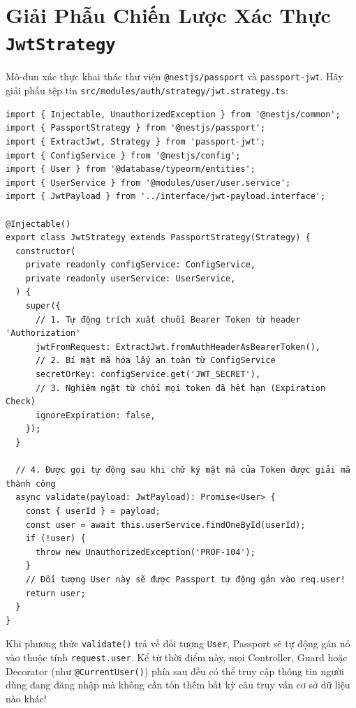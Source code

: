 \documentclass[12pt,a4paper,oneside]{book}
\begin{document}
\section{Giải Phẫu Chiến Lược Xác Thực \texttt{JwtStrategy}}
Mô-đun xác thực khai thác thư viện \texttt{@nestjs/passport} và \texttt{passport-jwt}. Hãy giải phẫu tệp tin \texttt{src/modules/auth/strategy/jwt.strategy.ts}:

\begin{codebox}
\begin{Verbatim}[fontsize=\small]
import { Injectable, UnauthorizedException } from '@nestjs/common';
import { PassportStrategy } from '@nestjs/passport';
import { ExtractJwt, Strategy } from 'passport-jwt';
import { ConfigService } from '@nestjs/config';
import { User } from '@database/typeorm/entities';
import { UserService } from '@modules/user/user.service';
import { JwtPayload } from '../interface/jwt-payload.interface';

@Injectable()
export class JwtStrategy extends PassportStrategy(Strategy) {
  constructor(
    private readonly configService: ConfigService,
    private readonly userService: UserService,
  ) {
    super({
      // 1. Tự động trích xuất chuỗi Bearer Token từ header 'Authorization'
      jwtFromRequest: ExtractJwt.fromAuthHeaderAsBearerToken(),
      // 2. Bí mật mã hóa lấy an toàn từ ConfigService
      secretOrKey: configService.get('JWT_SECRET'),
      // 3. Nghiêm ngặt từ chối mọi token đã hết hạn (Expiration Check)
      ignoreExpiration: false,
    });
  }

  // 4. Được gọi tự động sau khi chữ ký mật mã của Token được giải mã thành công
  async validate(payload: JwtPayload): Promise<User> {
    const { userId } = payload;
    const user = await this.userService.findOneById(userId);
    if (!user) {
      throw new UnauthorizedException('PROF-104');
    }
    // Đối tượng User này sẽ được Passport tự động gán vào req.user!
    return user;
  }
}
\end{Verbatim}
\end{codebox}

\begin{infobox}
  Khi phương thức \texttt{validate()} trả về đối tượng \texttt{User}, Passport sẽ tự động gán nó vào thuộc tính \texttt{request.user}. Kể từ thời điểm này, mọi Controller, Guard hoặc Decorator (như \texttt{@CurrentUser()}) phía sau đều có thể truy cập thông tin người dùng đang đăng nhập mà không cần tốn thêm bất kỳ câu truy vấn cơ sở dữ liệu nào khác!
\end{infobox}
\end{document}
